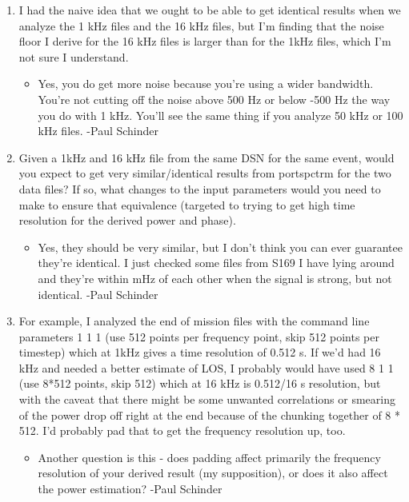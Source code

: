 \documentclass[crop=false,class=book]{standalone}
\begin{document}
\begin{enumerate}
    \item I had the naive idea that we ought to be able to get identical results when we analyze the 1 kHz files and the 16 kHz files, but I'm finding that the noise floor I derive for the 16 kHz files is larger than for the 1kHz files, which I'm not sure I understand. 
    \begin{itemize}
        \item Yes, you do get more noise because you’re using a wider bandwidth.  You’re not cutting off the noise above 500 Hz or below -500 Hz the way you do with 1 kHz.  You’ll see the same thing if you analyze 50 kHz or 100 kHz files. -Paul Schinder
    \end{itemize}
    \item Given a 1kHz and 16 kHz file from the same DSN for the same event, would you expect to get very similar/identical results from portspctrm for the two data files? If so, what changes to the input parameters would you need to make to ensure that equivalence (targeted to trying to get high time resolution for the derived power and phase).
    \begin{itemize}
        \item Yes, they should be very similar, but I don’t think you can ever guarantee they’re identical.  I just checked some files from S169 I have lying around and they’re within  mHz of each other when the signal is strong, but not identical. -Paul Schinder
    \end{itemize}
    \item For example, I analyzed the end of mission files with the command line parameters 1 1 1 (use 512 points per frequency point, skip 512 points per timestep) which at 1kHz gives a time resolution of 0.512 s.  If  we’d had 16 kHz and needed a better estimate of LOS, I probably would have used 8 1 1 (use 8*512 points, skip 512) which at 16 kHz is 0.512/16 s resolution, but with the caveat that there might be some unwanted correlations or smearing of the power drop off right at the end because of the chunking together of 8 * 512.  I’d probably pad that to get the frequency resolution up, too.
    \begin{itemize}
        \item Another question is this - does padding affect primarily the frequency resolution of your derived result (my supposition), or does it also affect the power estimation? -Paul Schinder
    \end{itemize}
\end{enumerate}
\end{document}
